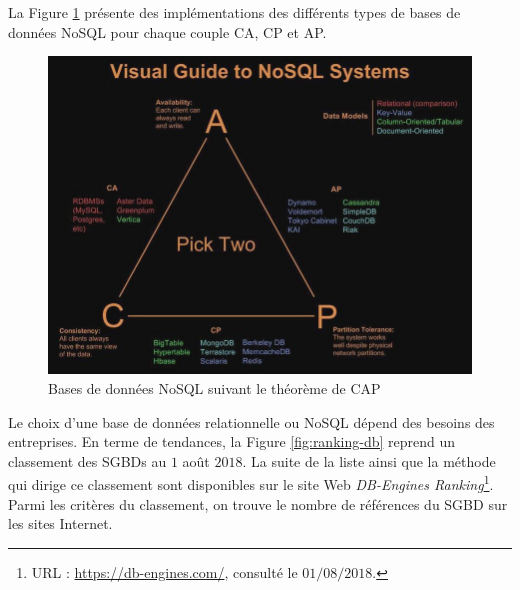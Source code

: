 		La Figure \ref{fig:cap} présente des implémentations des différents types de bases de données NoSQL pour chaque couple CA, CP et AP.
		
		\begin{figure}[h]
			\centering
			\captionsetup{justification=centering}
			\includegraphics[width=1\linewidth]{illustrations/cap}
			\caption{Bases de données NoSQL suivant le théorème de CAP }
			\label{fig:cap}
		\end{figure}
		
		
		
		Le choix d'une base de données relationnelle ou NoSQL dépend des besoins des entreprises. En terme de tendances, la Figure \ref{fig:ranking-db} reprend un classement des SGBDs au $1$ août $ 2018 $. La suite de la liste ainsi que  la méthode qui dirige ce classement sont    disponibles sur le site  Web \textit{DB-Engines Ranking}\footnote{URL : \url{https://db-engines.com/},  consulté le $01/08/2018$.}. Parmi les critères du classement, on trouve le nombre de références du SGBD sur les sites Internet. 
		
		
